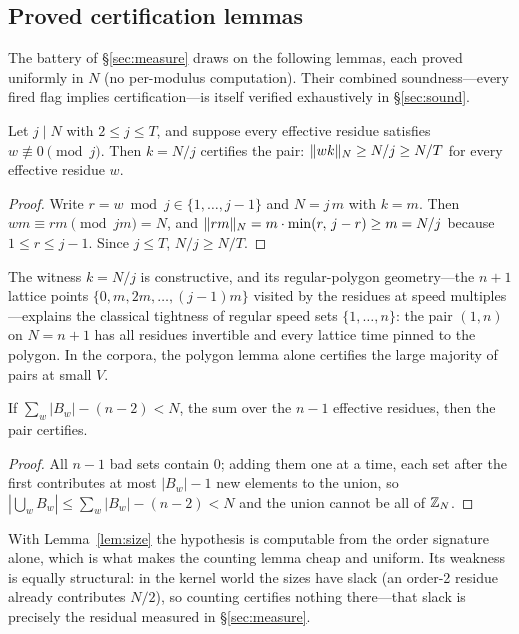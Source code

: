 \subsection{Proved certification lemmas}

The battery of \S\ref{sec:measure} draws on the following lemmas, each
proved uniformly in $N$ (no per-modulus computation). Their combined
soundness---every fired flag implies certification---is itself verified
exhaustively in \S\ref{sec:sound}.

\begin{lemma}\label{lem:jgon}
Let $j\mid N$ with $2\le j\le T$, and suppose every effective residue
satisfies $w\not\equiv 0\pmod j$. Then $k=N/j$ certifies the pair:
$\lVert wk \rVert_{N}\ge N/j\ge N/T$ for every effective residue $w$.
\end{lemma}

\begin{proof}
Write $r=w\bmod j\in\{1,\dots,j-1\}$ and $N=j\,m$ with $k=m$. Then
$wm\equiv rm\pmod{jm}=N$, and
$\lVert rm \rVert_{N}=m\cdot\min(r,\,j-r)\ge m=N/j$ because
$1\le r\le j-1$. Since $j\le T$, $N/j\ge N/T$.
\end{proof}

The witness $k=N/j$ is constructive, and its regular-polygon
geometry---the $n{+}1$ lattice points $\{0,m,2m,\dots,(j{-}1)m\}$ visited
by the residues at speed multiples---explains the classical tightness of
regular speed sets $\{1,\dots,n\}$: the pair $(1,n)$ on $N=n+1$ has all
residues invertible and every lattice time pinned to the polygon. In the
corpora, the polygon lemma alone certifies the large majority of pairs at
small $V$.

\begin{lemma}\label{lem:counting}
If $\sum_w |B_w|-(n-2)<N$, the sum over the $n-1$ effective residues, then
the pair certifies.
\end{lemma}

\begin{proof}
All $n-1$ bad sets contain $0$; adding them one at a time, each set after
the first contributes at most $|B_w|-1$ new elements to the union, so
$|\bigcup_w B_w|\le \sum_w|B_w|-(n-2)<N$ and the union cannot be all of
$\mathbb{Z}_N$.
\end{proof}

With Lemma~\ref{lem:size} the hypothesis is computable from the order
signature alone, which is what makes the counting lemma cheap and uniform.
Its weakness is equally structural: in the kernel world the sizes have
slack (an order-2 residue already contributes $N/2$), so counting certifies
nothing there---that slack is precisely the residual measured in
\S\ref{sec:measure}.

